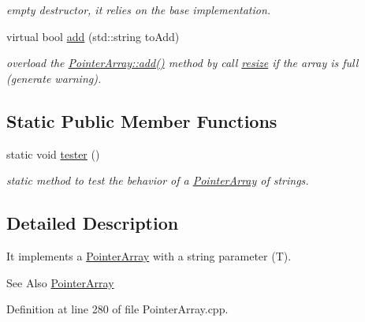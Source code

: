 \begin{DoxyCompactItemize}
\begin{DoxyCompactList}\small\item\em empty destructor, it relies on the base implementation. \end{DoxyCompactList}\item 
\hypertarget{classparray_1_1StringPointerArray_a5b79fa79d5aa75cd4572e7b87f6da25f}{virtual bool \hyperlink{classparray_1_1StringPointerArray_a5b79fa79d5aa75cd4572e7b87f6da25f}{add} (std\-::string to\-Add)}\label{classparray_1_1StringPointerArray_a5b79fa79d5aa75cd4572e7b87f6da25f}

\begin{DoxyCompactList}\small\item\em overload the \hyperlink{classparray_1_1PointerArray_ae080aeced3af072006e4a609fdadb838}{Pointer\-Array\-::add()} method by call \hyperlink{classparray_1_1PointerArray_a6d4347a899d2783d23775957ad71f743}{resize} if the array is full (generate warning). \end{DoxyCompactList}\end{DoxyCompactItemize}
\subsection*{Static Public Member Functions}
\begin{DoxyCompactItemize}
\item 
static void \hyperlink{classparray_1_1StringPointerArray_abfac13570bec8c88311714d19ddea59b}{tester} ()
\begin{DoxyCompactList}\small\item\em static method to test the behavior of a \hyperlink{classparray_1_1PointerArray}{Pointer\-Array} of strings. \end{DoxyCompactList}\end{DoxyCompactItemize}


\subsection{Detailed Description}
It implements a \hyperlink{classparray_1_1PointerArray_ab506b284822d1e013813579e06893797}{Pointer\-Array} with a string parameter (T). 

\begin{DoxySeeAlso}{See Also}
\hyperlink{classparray_1_1PointerArray}{Pointer\-Array} 
\end{DoxySeeAlso}


Definition at line 280 of file Pointer\-Array.\-cpp.



